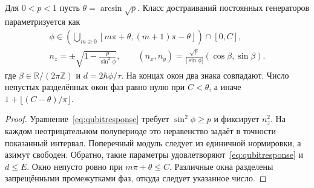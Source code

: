 \begin{theorem}\label{thm:fibre}
{Для $0<p<1$ пусть $\theta=\arcsin\sqrt p$. Класс достраиваний постоянных генераторов параметризуется как}
\begin{equation}\label{eq:windows}
 \begin{gathered}
 \phi\in\left(\bigcup_{m\geq0}[m\pi+\theta,(m+1)\pi-\theta]\right)\cap[0,C],\\
 n_z=\pm\sqrt{1-\frac p{\sin^2\phi}},\qquad
 (n_x,n_y)=\frac{\sqrt p}{|\sin\phi|}(\cos\beta,\sin\beta).
 \end{gathered}
\end{equation}
{где $\beta\in\mathbb R/(2\pi\mathbb Z)$ и $d=2\hbar\phi/\tau$. На концах окон два знака совпадают. Число непустых разделённых окон фаз равно нулю при $C<\theta$, а иначе $1+\lfloor(C-\theta)/\pi\rfloor$.}
\end{theorem}
\begin{proof}
{Уравнение~\eqref{eq:qubitresponse} требует $\sin^2\phi\geq p$ и фиксирует $n_z^2$. На каждом неотрицательном полупериоде это неравенство задаёт в точности показанный интервал. Поперечный модуль следует из единичной нормировки, а азимут свободен. Обратно, такие параметры удовлетворяют~\eqref{eq:qubitresponse} и $d\leq E$. Окно непусто ровно при $m\pi+\theta\leq C$. Различные окна разделены запрещёнными промежутками фаз, откуда следует указанное число.}
\end{proof}

